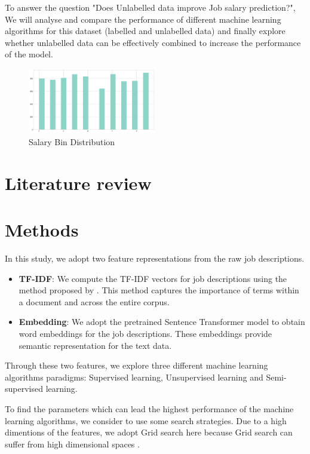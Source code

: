 \documentclass[11pt]{article}
\begin{document}
To answer the question "Does Unlabelled data improve Job salary prediction?", 
We will analyse and compare the performance of different machine learning algorithms for this dataset (labelled and unlabelled data) 
and finally explore whether unlabelled data can be effectively combined to increase the performance of the model.

\begin{figure}[t]
    \centering
    \includegraphics[width=0.5\textwidth]{dataset_output.png}
    \caption{Salary Bin Distribution}
    \label{fig:dataset_output}
\end{figure}

\section{Literature review}


\section{Methods}


In this study, we adopt two feature representations from the raw job descriptions.

\begin{itemize}
    \item \textbf{TF-IDF}: We compute the TF-IDF vectors for job descriptions using the method proposed by \cite{manning2008introduction}. This method captures the importance of terms within a document and across the entire corpus.
    \item \textbf{Embedding}: We adopt the pretrained Sentence Transformer model \cite{reimers-gurevych-2019-sentence} to obtain word embeddings for the job descriptions. These embeddings provide semantic representation for the text data.
\end{itemize}


Through these two features, we explore three different machine learning algorithms paradigms: Supervised learning, Unsupervised learning and Semi-supervised learning.

To find the parameters which can lead the highest performance of the machine learning algorithms, we consider to use some search strategies.
Due to a high dimentions of the features, we adopt Grid search here because Grid search can suffer from high dimensional spaces \cite{liashchynskyi2019grid}.
\end{document}
